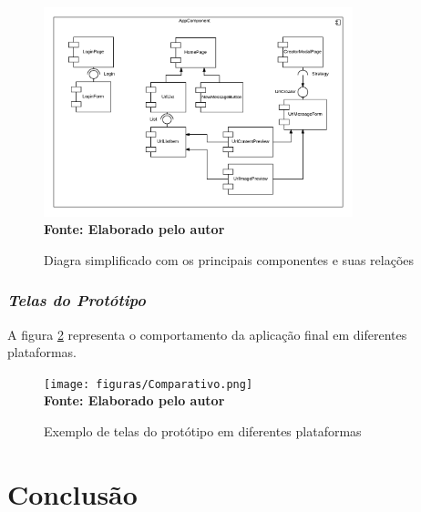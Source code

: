\begin{figure}[ht]
	\centering	
	\caption[\hspace{0.1cm}Diagra simplificado com os principais componentes e suas relações.]{Diagra simplificado com os principais componentes e suas relações}
	\vspace{-0.4cm}
	\includegraphics[width=0.8\textwidth]{figuras/Components.png}
	\vspace{-0.2cm}
	\\\textbf{\footnotesize Fonte: Elaborado pelo autor }
	\label{fig:figura4}
\end{figure}


\subsubsection{{\it Telas do Protótipo}}
A figura \ref{fig:figura5} representa o comportamento da aplicação final em diferentes plataformas.

\begin{figure}[ht]
	\centering	
	\caption[\hspace{0.1cm}Exemplo de telas do protótipo em diferentes plataformas.]{Exemplo de telas do protótipo em diferentes plataformas}
	\vspace{-0.4cm}
	\texttt{[image: figuras/Comparativo.png]}
	\vspace{-0.2cm}
	\\\textbf{\footnotesize Fonte: Elaborado pelo autor }
	\label{fig:figura5}
\end{figure}
\vspace{-0.5cm}


\section{\esp Conclusão}

